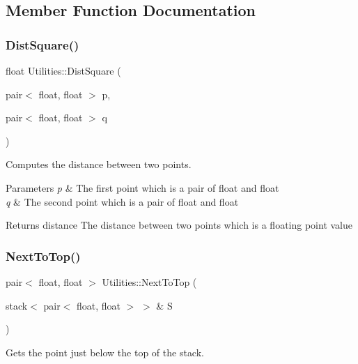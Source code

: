 \subsection{Member Function Documentation}
\mbox{\label{classUtilities_a5cc883930447bfc39d81ea4daa5a7027}} 
\subsubsection{\texorpdfstring{Dist\+Square()}{DistSquare()}}
{\footnotesize\ttfamily float Utilities\+::\+Dist\+Square (\begin{DoxyParamCaption}\item[{pair$<$ float, float $>$}]{p,  }\item[{pair$<$ float, float $>$}]{q }\end{DoxyParamCaption})}



Computes the distance between two points. 


\begin{DoxyParams}{Parameters}
{\em p} & The first point which is a pair of float and float \\
\hline
{\em q} & The second point which is a pair of float and float \\
\hline
\end{DoxyParams}
\begin{DoxyReturn}{Returns}
distance The distance between two points which is a floating point value 
\end{DoxyReturn}
\mbox{\label{classUtilities_a7a615679924f608ac116edfe146f8c1c}} 
\subsubsection{\texorpdfstring{Next\+To\+Top()}{NextToTop()}}
{\footnotesize\ttfamily pair$<$ float, float $>$ Utilities\+::\+Next\+To\+Top (\begin{DoxyParamCaption}\item[{stack$<$ pair$<$ float, float $>$ $>$ \&}]{S }\end{DoxyParamCaption})}



Gets the point just below the top of the stack. 


